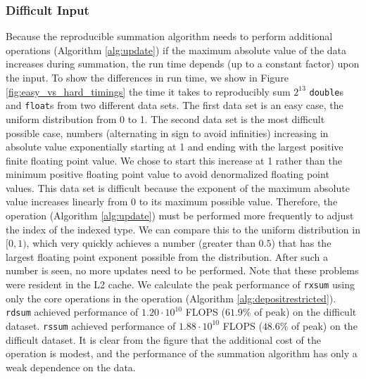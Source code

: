   \subsubsection{Difficult Input}
    Because the reproducible summation algorithm needs to perform additional
    operations (Algorithm \ref{alg:update}) if the maximum absolute value of the
    data increases during summation, the run time depends (up to a constant factor)
    upon the input. To show the differences in run time, we show in Figure
    \ref{fig:easy_vs_hard_timings} the time it takes to reproducibly sum $2^{13}$
    \texttt{double}s and \texttt{float}s from two different data sets. The first
    data set is an easy case, the uniform distribution from 0 to 1. The second data
    set is the most difficult possible case, numbers (alternating in sign to avoid
    infinities) increasing in absolute value exponentially starting at 1 and ending
    with the largest positive finite floating point value. We chose to start this
    increase at 1 rather than the minimum positive floating point value to avoid
    denormalized floating point values. This data set is difficult because the
    exponent of the maximum absolute value increases linearly from 0 to its maximum
    possible value. Therefore, the  operation (Algorithm
    \ref{alg:update}) must be performed more frequently to adjust the index of the
    indexed type. We can compare this to the uniform distribution in $[0, 1)$,
    which very quickly achieves a number (greater than $0.5$) that has the largest
    floating point exponent possible from the distribution. After such a number is
    seen, no more updates need to be performed. Note that these problems were
    resident in the L2 cache. We calculate the peak performance of \texttt{rxsum}
    using only the core operations in the  operation
    (Algorithm \ref{alg:depositrestricted}). \texttt{rdsum} achieved performance of
    $1.20\cdot 10^{10}$ FLOPS ($61.9\%$ of peak) on the difficult dataset.
    \texttt{rssum} achieved performance of $1.88\cdot 10^{10}$ FLOPS ($48.6\%$ of
    peak) on the difficult dataset. It is clear from the figure that the additional
    cost of the  operation is modest, and the performance of the
    summation algorithm has only a weak dependence on the data.
